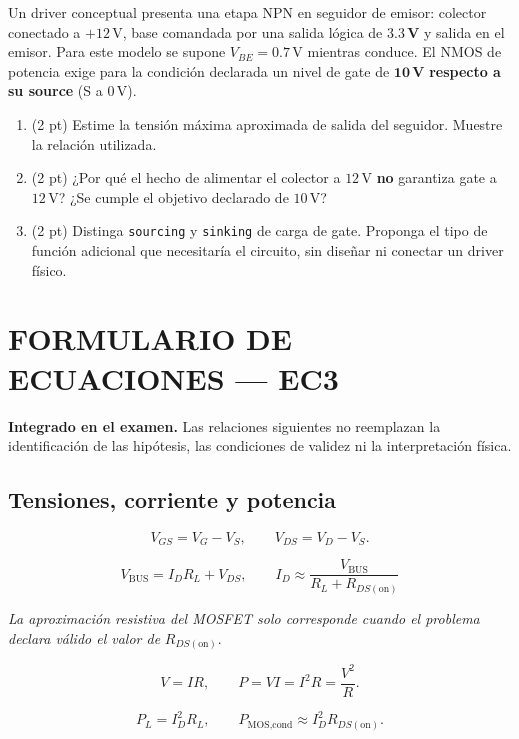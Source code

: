 \documentclass[11pt, a4paper]{article}
\begin{document}
\vspace{0.1cm}
Un driver conceptual presenta una etapa NPN en seguidor de emisor: colector conectado a $+12\,\text{V}$, base comandada por una salida lógica de $\mathbf{3.3\,\text{V}}$ y salida en el emisor. Para este modelo se supone $V_{BE} = 0.7\,\text{V}$ mientras conduce. El NMOS de potencia exige para la condición declarada un nivel de gate de $\mathbf{10\,\text{V}}$ \textbf{respecto a su source} (S a $0\,\text{V}$).

\begin{enumerate}[label=\arabic*., noitemsep, topsep=3pt]
    \item (2 pt) Estime la tensión máxima aproximada de salida del seguidor. Muestre la relación utilizada.
    \item (2 pt) ¿Por qué el hecho de alimentar el colector a $12\,\text{V}$ \textbf{no} garantiza gate a $12\,\text{V}$? ¿Se cumple el objetivo declarado de $10\,\text{V}$?
    \item (2 pt) Distinga \texttt{sourcing} y \texttt{sinking} de carga de gate. Proponga el tipo de función adicional que necesitaría el circuito, sin diseñar ni conectar un driver físico.
\end{enumerate}


\newpage
\section*{FORMULARIO DE ECUACIONES — EC3}

\noindent
\textbf{Integrado en el examen.} Las relaciones siguientes no reemplazan la identificación de las hipótesis, las condiciones de validez ni la interpretación física.

\subsection*{Tensiones, corriente y potencia}

\[V_{GS}=V_G-V_S,\qquad V_{DS}=V_D-V_S.\]

\[V_{\text{BUS}}=I_D R_L+V_{DS},\qquad I_D\approx\frac{V_{\text{BUS}}}{R_L+R_{DS(\text{on})}}\]

\noindent\textit{La aproximación resistiva del MOSFET solo corresponde cuando el problema declara válido el valor de} $R_{DS(\text{on})}$.

\[V=IR,\qquad P=VI=I^2R=\frac{V^2}{R}.\]

\[P_{L}=I_D^2R_L,\qquad P_{\text{MOS,cond}}\approx I_D^2R_{DS(\text{on})}.\]
\end{document}
